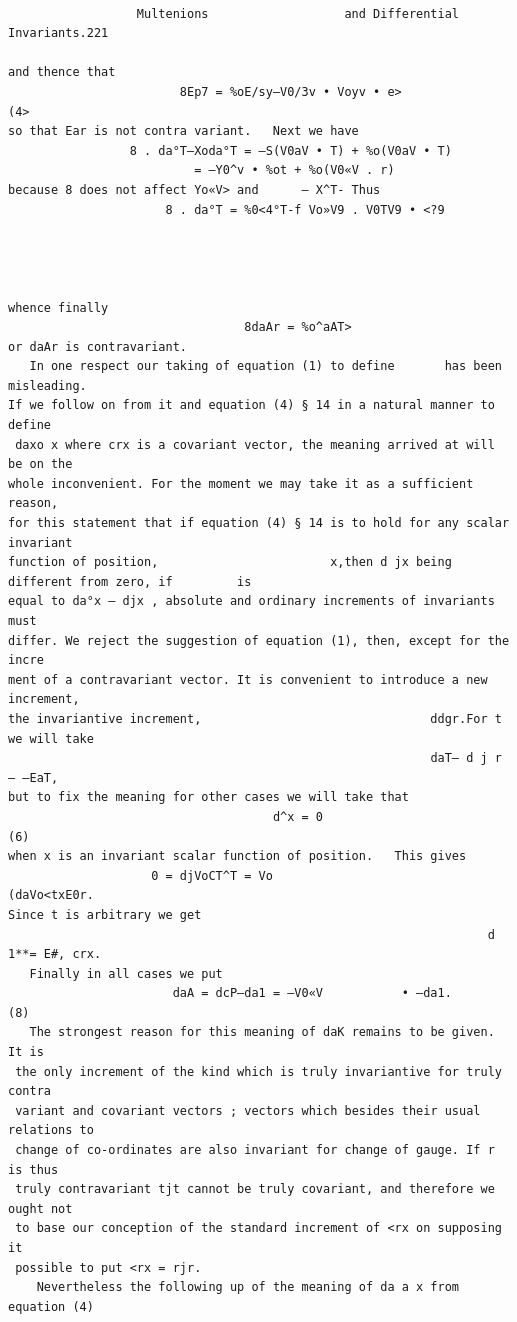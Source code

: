 \documentclass[10pt]{article}
\begin{document}
\clearpage
\begin{verbatim}

                  Multenions                   and Differential Invariants.221

and thence that
                        8Ep7 = %oE/sy—V0/3v • Voyv • e>                        (4>
so that Ear is not contra variant.   Next we have
                 8 . da°T—Xoda°T = —S(V0aV • T) + %o(V0aV • T)
                          = —Y0^v • %ot + %o(V0«V . r)
because 8 does not affect Yo«V> and      — X^T- Thus
                      8 . da°T = %0<4°T-f Vo»V9 . V0TV9 • <?9




whence finally
                                 8daAr = %o^aAT>
or daAr is contravariant.
   In one respect our taking of equation (1) to define       has been misleading.
If we follow on from it and equation (4) § 14 in a natural manner to define
 daxo x where crx is a covariant vector, the meaning arrived at will be on the
whole inconvenient. For the moment we may take it as a sufficient reason,
for this statement that if equation (4) § 14 is to hold for any scalar invariant
function of position,                        x,then d jx being different from zero, if         is
equal to da°x — djx , absolute and ordinary increments of invariants must
differ. We reject the suggestion of equation (1), then, except for the incre­
ment of a contravariant vector. It is convenient to introduce a new increment,
the invariantive increment,                                ddgr.For t we will take
                                                           daT— d j r — —EaT,
but to fix the meaning for other cases we will take that
                                     d^x = 0                                   (6)
when x is an invariant scalar function of position.   This gives
                    0 = djVoCT^T = Vo                                           (daVo<txE0r.
Since t is arbitrary we get
                                                                   d 1**= E#, crx.
   Finally in all cases we put
                       daA = dcP—da1 = —V0«V           • —da1.              (8)
   The strongest reason for this meaning of daK remains to be given. It is
 the only increment of the kind which is truly invariantive for truly contra­
 variant and covariant vectors ; vectors which besides their usual relations to
 change of co-ordinates are also invariant for change of gauge. If r is thus
 truly contravariant tjt cannot be truly covariant, and therefore we ought not
 to base our conception of the standard increment of <rx on supposing it
 possible to put <rx = rjr.
    Nevertheless the following up of the meaning of da a x from equation (4)


\end{verbatim}
\end{document}
